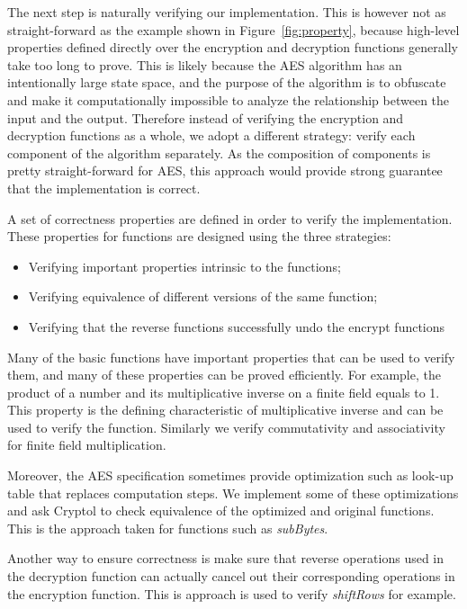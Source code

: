 \documentclass[a4paper, notitlepage]{report}
\begin{document}
The next step  is naturally verifying our implementation.
This is however not as straight-forward as the example shown in
Figure~\ref{fig:property}, because high-level properties defined directly over
the encryption and decryption functions generally take too long to prove.
This is likely because the AES algorithm has an intentionally large state space,
and the purpose of the algorithm is to obfuscate and make it computationally impossible
to analyze the relationship between the input and the output.
Therefore instead of verifying the encryption and decryption functions as a whole,
we adopt a different strategy: verify each component of the algorithm separately.
As the composition of components is pretty straight-forward for AES, this approach
would provide strong guarantee that the implementation is correct.

A set of correctness properties are defined in order to verify the implementation.
These properties for functions are designed using the three strategies:
\begin{itemize}
\item Verifying important properties intrinsic to the functions;
\item Verifying equivalence of different versions of the same function;
\item Verifying that the reverse functions successfully undo the encrypt functions
\end{itemize} 

Many of the basic functions have important properties that can be used to verify
them, and many of these properties can be proved efficiently. For example, the
product of a number and its multiplicative inverse on a finite field equals to 1.
This property is the defining characteristic of multiplicative inverse and can be used
to verify the function. Similarly we verify commutativity and associativity for
finite field multiplication.

Moreover, the AES specification sometimes provide optimization such as look-up table
that replaces computation steps. We implement some of these optimizations and
ask Cryptol to check equivalence of the optimized and original functions. This is
the approach taken for functions such as \emph{subBytes}.

Another way to ensure correctness is make sure that reverse operations used in the
decryption function can actually cancel out their corresponding operations in
the encryption function. This is approach is used to verify \emph{shiftRows} for
example.
\end{document}
